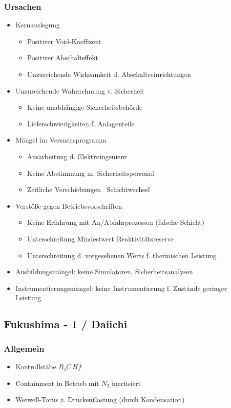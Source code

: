 \documentclass[12pt]{article}
\begin{document}
\subsubsection{Ursachen}
\begin{itemize}
  \item Kernauslegung
  \begin{itemize}
    \item Positiver Void-Koeffizent
    \item Positiver Abschalteffekt
    \item Unzureichende Wirksamkeit d. Abschalteeinrichtungen
  \end{itemize}
  \item Unzureichende Wahrnehmung v. Sicherheit
  \begin{itemize}
    \item Keine unabhängige Sicherheitsbehörde
    \item Lieferschwierigkeiten f. Anlagenteile
  \end{itemize}
  \item Mängel im Versuchsprogramm
  \begin{itemize}
    \item Ausarbeitung d. Elektroingenieur
    \item Keine Abstimmung m. Sicherheitspersonal
    \item Zeitliche Verschiebungen \textrightarrow\ Schichtwechsel
  \end{itemize}
  \item Verstöße gegen Betriebsvorschriften
  \begin{itemize}
    \item Keine Erfahrung mit An/Abfahrprozessen (falsche Schicht)
    \item Unterschreitung Mindestwert Reaktivitätsreserve
    \item Unterschreitung d. vorgesehenen Werts f. thermischen Leistung 
  \end{itemize}
  \item Ausbildungsmängel: keine Simulatoren, Sicherheitsanalysen
  \item Instrumentierungsmängel: keine Instrumentierung f. Zustände geringer Leistung
\end{itemize}

\subsection{Fukushima - 1 / Daiichi}

\subsubsection{Allgemein}
\begin{itemize}
  \item Kontrollstäbe \(B_4C\, Hf\)
  \item Containment in Betrieb mit \(N_2\) inertisiert
  \item Wetwell-Torus z. Druckentlastung (durch Kondensation)
\end{itemize}
\end{document}
